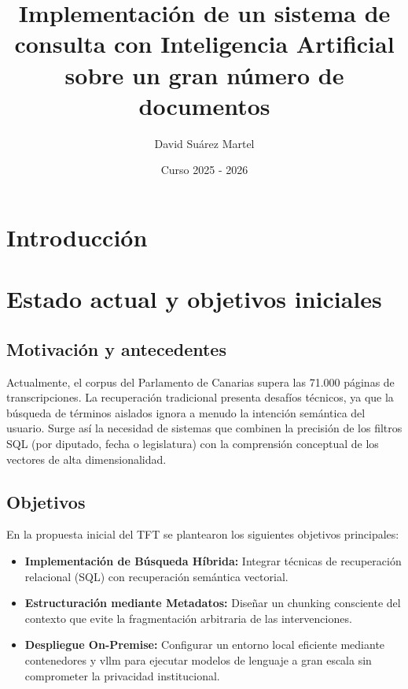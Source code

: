 \documentclass[oneside,12pt]{book}
\title{Implementación de un sistema de consulta con Inteligencia Artificial sobre un gran
número de documentos}
\author{David Suárez Martel}
\date{Curso 2025 - 2026}
\begin{document}




\newpage
{}



\clearpage

\tableofcontents

\listofalgorithms 

\listoffigures

\listoftables


\clearpage
{}

\chapter{Introducción}


\chapter{Estado actual y objetivos iniciales}
%
\section{Motivación y antecedentes}
Actualmente, el corpus del Parlamento de Canarias supera las 71.000 páginas de transcripciones. La recuperación tradicional presenta desafíos técnicos, ya que la búsqueda de términos aislados ignora a menudo la intención semántica del usuario. Surge así la necesidad de sistemas que combinen la precisión de los filtros SQL (por diputado, fecha o legislatura) con la comprensión conceptual de los vectores de alta dimensionalidad.

\section{Objetivos}
En la propuesta inicial del TFT se plantearon los siguientes objetivos principales:
\begin{itemize}
    \item \textbf{Implementación de Búsqueda Híbrida:} Integrar técnicas de recuperación relacional (SQL) con recuperación semántica vectorial.
    \item \textbf{Estructuración mediante Metadatos:} Diseñar un chunking consciente del contexto que evite la fragmentación arbitraria de las intervenciones.
    \item \textbf{Despliegue On-Premise:} Configurar un entorno local eficiente mediante contenedores y \gls{vllm} para ejecutar modelos de lenguaje a gran escala sin comprometer la privacidad institucional.
\end{itemize}
\end{document}
